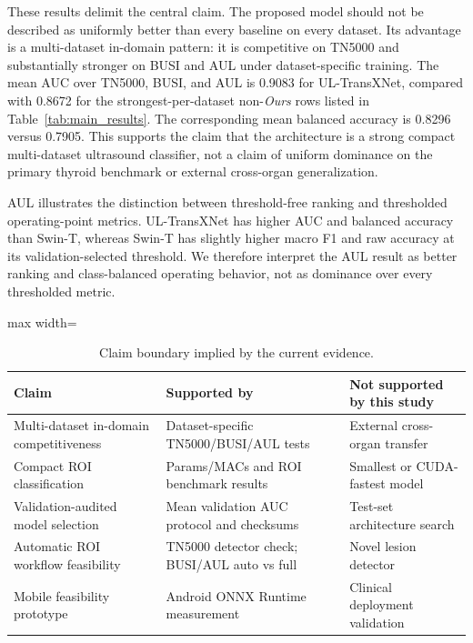 These results delimit the central claim. The proposed model should not be described as uniformly better than every baseline on every dataset. Its advantage is a multi-dataset in-domain pattern: it is competitive on TN5000 and substantially stronger on BUSI and AUL under dataset-specific training. The mean AUC over TN5000, BUSI, and AUL is 0.9083 for UL-TransXNet, compared with 0.8672 for the strongest-per-dataset non-\textit{Ours} rows listed in Table~\ref{tab:main_results}. The corresponding mean balanced accuracy is 0.8296 versus 0.7905. This supports the claim that the architecture is a strong compact multi-dataset ultrasound classifier, not a claim of uniform dominance on the primary thyroid benchmark or external cross-organ generalization.

AUL illustrates the distinction between threshold-free ranking and thresholded operating-point metrics. UL-TransXNet has higher AUC and balanced accuracy than Swin-T, whereas Swin-T has slightly higher macro F1 and raw accuracy at its validation-selected threshold. We therefore interpret the AUL result as better ranking and class-balanced operating behavior, not as dominance over every thresholded metric.

\begin{table}[t]
    \centering
    \small
    \caption{Claim boundary implied by the current evidence.}
    \label{tab:claim_boundary}
    \begin{adjustbox}{max width=\columnwidth}
    \begin{tabular}{lll}
        \toprule
        Claim & Supported by & Not supported by this study \\
        \midrule
        Multi-dataset in-domain competitiveness & Dataset-specific TN5000/BUSI/AUL tests & External cross-organ transfer \\
        Compact ROI classification & Params/MACs and ROI benchmark results & Smallest or CUDA-fastest model \\
        Validation-audited model selection & Mean validation AUC protocol and checksums & Test-set architecture search \\
        Automatic ROI workflow feasibility & TN5000 detector check; BUSI/AUL auto vs full & Novel lesion detector \\
        Mobile feasibility prototype & Android ONNX Runtime measurement & Clinical deployment validation \\
        \bottomrule
    \end{tabular}
    \end{adjustbox}
\end{table}


